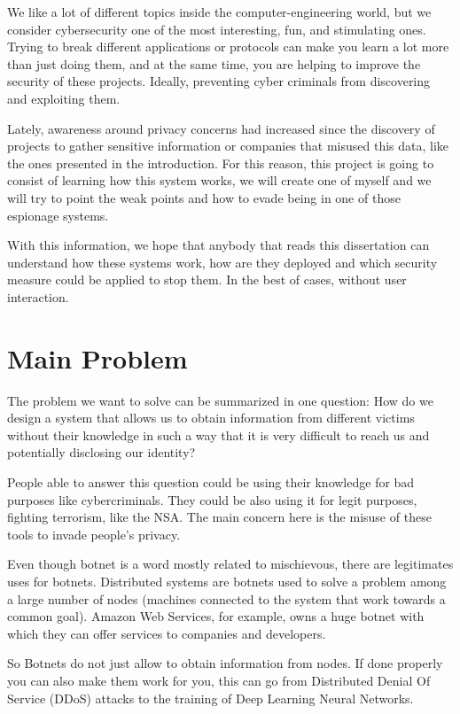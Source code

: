 \documentclass[11pt, a4paper,twoside]{tesi_upf}
\begin{document}
We like a lot of different topics inside the computer-engineering world, but we consider cybersecurity one of the most interesting, fun, and stimulating ones. Trying to break different applications or protocols can make you learn a lot more than just doing them, and at the same time, you are helping to improve the security of these projects. Ideally, preventing cyber criminals from discovering and exploiting them.

Lately, awareness around privacy concerns had increased since the discovery of projects to gather sensitive information or companies that misused this data, like the ones presented in the introduction. For this reason, this project is going to consist of learning how this system works, we will create one of myself and we will try to point the weak points and how to evade being in one of those espionage systems.

With this information, we hope that anybody that reads this dissertation can understand how these systems work, how are they deployed and which security measure could be applied to stop them. In the best of cases, without user interaction.

\section{Main Problem}

The problem we want to solve can be summarized in one question: How do we design a system that allows us to obtain information from different victims without their knowledge in such a way that it is very difficult to reach us and potentially disclosing our identity?

People able to answer this question could be using their knowledge for bad purposes like cybercriminals. They could be also using it for legit purposes, fighting terrorism, like the NSA. The main concern here is the misuse of these tools to invade people's privacy.

Even though botnet is a word mostly related to mischievous, there are legitimates uses for botnets. Distributed systems are botnets used to solve a problem among a large number of nodes (machines connected to the system that work towards a common goal). Amazon Web Services, for example, owns a huge botnet with which they can offer services to companies and developers.

So Botnets do not just allow to obtain information from nodes. If done properly you can also make them work for you, this can go from Distributed Denial Of Service (DDoS) attacks to the training of Deep Learning Neural Networks.
\end{document}
